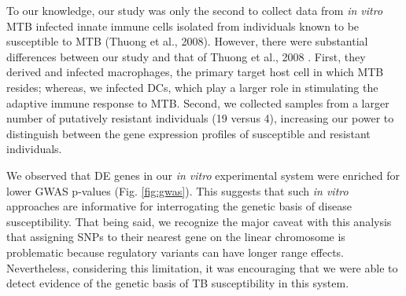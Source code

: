 \documentclass[fleqn,10pt]{wlscirep}
\begin{document}
To our knowledge, our study was only the second to collect data from
\emph{in vitro} MTB infected innate immune cells isolated from
individuals known to be susceptible to MTB (Thuong et al., 2008).
However, there were substantial differences between our study and that
of Thuong et al., 2008 \cite{Thuong2008}. First, they derived and
infected macrophages, the primary target host cell in which MTB
resides; whereas, we infected DCs, which play a larger role in
stimulating the adaptive immune response to MTB. Second, we collected
samples from a larger number of putatively resistant individuals (19
versus 4), increasing our power to distinguish between the gene
expression profiles of susceptible and resistant individuals.

We observed that DE genes in our \emph{in vitro} experimental system
were enriched for lower GWAS p-values (Fig. \ref{fig:gwas}). This
suggests that such \emph{in vitro} approaches are informative for
interrogating the genetic basis of disease susceptibility. That being
said, we recognize the major caveat with this analysis that assigning
SNPs to their nearest gene on the linear chromosome is problematic
because regulatory variants can have longer range effects.
Nevertheless, considering this limitation, it was encouraging that we
were able to detect evidence of the genetic basis of TB susceptibility
in this system.
\end{document}
